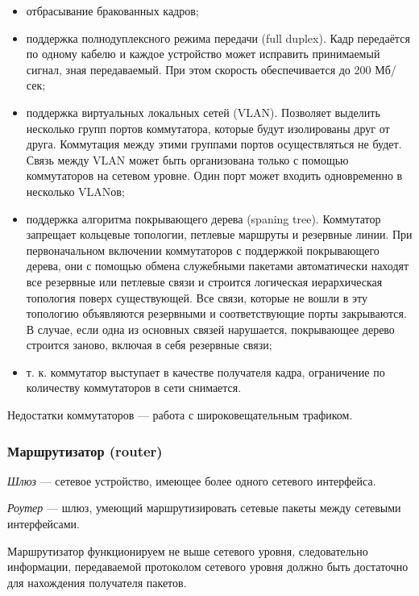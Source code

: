 \documentclass[12pt, russian, oneside, article]{ncc}
\begin{document}
\begin{itemize}
\begin{enumerate}
\begin{itemize}
\item отбрасывание бракованных кадров;
\item поддержка полнодуплексного режима передачи (full duplex). Кадр передаётся по одному кабелю и каждое устройство может исправить принимаемый сигнал, зная передаваемый. При этом скорость обеспечивается до 200 Мб/сек;
\item поддержка виртуальных локальных сетей (VLAN). Позволяет выделить несколько групп портов коммутатора, которые будут изолированы друг от друга. Коммутация между этими группами портов осуществляться не будет. Связь между VLAN может быть организована только с помощью коммутаторов на сетевом уровне. Один порт может входить одновременно в несколько VLANов;
\item поддержка алгоритма покрывающего дерева (spaning tree). Коммутатор запрещает кольцевые топологии, петлевые маршруты и резервные линии. При первоначальном включении коммутаторов с поддержкой покрывающего дерева, они с помощью обмена служебными пакетами автоматически находят все резервные или петлевые связи и строится логическая иерархическая топология поверх существующей. Все связи, которые не вошли в эту топологию объявляются резервными и соответствующие порты закрываются. В случае, если одна из основных связей нарушается, покрывающее дерево строится заново, включая в себя резервные связи;
\item т. к. коммутатор выступает в качестве получателя кадра, ограничение по количеству коммутаторов в сети снимается.
\end{itemize}

\end{enumerate}

Недостатки коммутаторов --- работа с широковещательным трафиком.

\end{itemize} %
\subsubsection{Маршрутизатор (router)}
\label{sec-4_8_5}


\emph{Шлюз} --- сетевое устройство, имеющее более одного сетевого интерфейса.

\emph{Роутер} --- шлюз, умеющий маршрутизировать сетевые пакеты между сетевыми интерфейсами.

Маршрутизатор функционируем не выше сетевого уровня, следовательно информации, передаваемой протоколом сетевого уровня должно быть достаточно для нахождения получателя пакетов.
\end{document}
